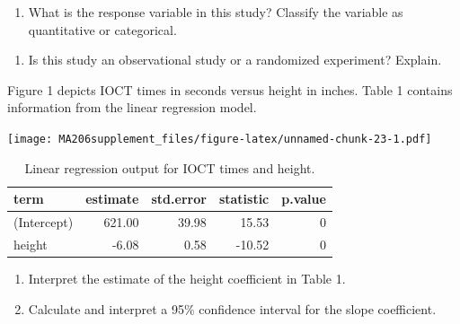 \documentclass[]{book}
\providecommand{\tightlist}{%
  \setlength{\itemsep}{0pt}\setlength{\parskip}{0pt}}
\begin{document}
\begin{enumerate}
\def\labelenumi{\arabic{enumi}.}
\setcounter{enumi}{2}
\tightlist
\item
  What is the response variable in this study? Classify the variable as quantitative or categorical.
\end{enumerate}

\vspace{0.25in}

\begin{enumerate}
\def\labelenumi{\arabic{enumi}.}
\setcounter{enumi}{3}
\tightlist
\item
  Is this study an observational study or a randomized experiment? Explain.
\end{enumerate}

\vspace{1in}

\newpage

Figure 1 depicts IOCT times in seconds versus height in inches. Table 1 contains information from the linear regression model.

\texttt{[image: MA206supplement\_files/figure-latex/unnamed-chunk-23-1.pdf]}

\begin{table}

\caption{\label{tab:unnamed-chunk-23}Linear regression output for IOCT times and height.}
\centering
\begin{tabular}[t]{l|r|r|r|r}
\hline
term & estimate & std.error & statistic & p.value\\
\hline
(Intercept) & 621.00 & 39.98 & 15.53 & 0\\
\hline
height & -6.08 & 0.58 & -10.52 & 0\\
\hline
\end{tabular}
\end{table}

\begin{enumerate}
\def\labelenumi{\arabic{enumi}.}
\setcounter{enumi}{4}
\item
  Interpret the estimate of the height coefficient in Table 1.

  \vspace{1in}
\item
  Calculate and interpret a 95\% confidence interval for the slope coefficient.
\end{enumerate}

\vspace{1in}

\newpage
\end{document}
